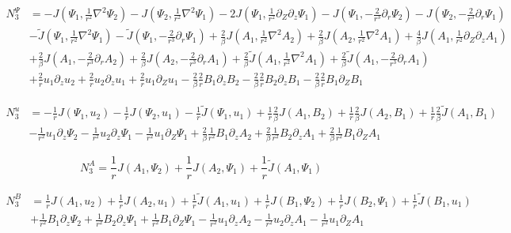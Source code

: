 \documentclass{emulateapj}
\newcommand{\beq}{\begin{equation}}
\newcommand{\eeq}{\end{equation}}
\begin{document}
\beq
\begin{split}
N_3^{\Psi} & = -J(\Psi_1, \frac{1}{r^2} \nabla^2 \Psi_2) - J(\Psi_2, \frac{1}{r^2} \nabla^2\Psi_1) - 2 J (\Psi_1, \frac{1}{r^2}\partial_Z\partial_z \Psi_1) - J(\Psi_1, -\frac{2}{r^3}\partial_r \Psi_2) - J(\Psi_2, -\frac{2}{r^3}\partial_r \Psi_1) \\
& - \widetilde{J}(\Psi_1, \frac{1}{r^2} \nabla^2 \Psi_1) - \widetilde{J} (\Psi_1, -\frac{2}{r^3}\partial_r \Psi_1) + \frac{2}{\beta} J(A_1, \frac{1}{r^2}\nabla^2 A_2) + \frac{2}{\beta} J(A_2, \frac{1}{r^2}\nabla^2 A_1) + \frac{4}{\beta} J(A_1, \frac{1}{r^2}\partial_Z\partial_z A_1) \\ 
& + \frac{2}{\beta} J(A_1, -\frac{2}{r^3} \partial_r A_2 ) + \frac{2}{\beta} J(A_2, -\frac{2}{r^3} \partial_r A_1) + \frac{2}{\beta} \widetilde{J} (A_1, \frac{1}{r^2} \nabla^2 A_1) + \frac{2}{\beta} \widetilde{J} (A_1, -\frac{2}{r^3} \partial_r A_1) \\
& + \frac{2}{r} u_1 \partial_z u_2 + \frac{2}{r} u_2 \partial_z u_1 + \frac{2}{r} u_1 \partial_Z u_1 - \frac{2}{\beta}\frac{2}{r} B_1\partial_z B_2 - \frac{2}{\beta}\frac{2}{r} B_2 \partial_z B_1 - \frac{2}{\beta} \frac{2}{r} B_1 \partial_Z B_1
\end{split}
\eeq

\beq
\begin{split}
N_3^u & = -\frac{1}{r}J\left(\Psi_1, u_2\right) - \frac{1}{r}J\left(\Psi_2, u_1\right) - \frac{1}{r}\widetilde{J} \left(\Psi_1, u_1\right) + \frac{1}{r}\frac{2}{\beta} J\left(A_1, B_2\right) + \frac{1}{r} \frac{2}{\beta} J\left(A_2, B_1\right) + \frac{1}{r}\frac{2}{\beta}\widetilde{J}\left(A_1, B_1\right) \\
& - \frac{1}{r^2} u_1\partial_z \Psi_2 - \frac{1}{r^2} u_2 \partial_z \Psi_1 - \frac{1}{r^2} u_1 \partial_Z \Psi_1 + \frac{2}{\beta} \frac{1}{r^2} B_1 \partial_z A_2 + \frac{2}{\beta} \frac{1}{r^2} B_2 \partial_z A_1 + \frac{2}{\beta} \frac{1}{r^2} B_1 \partial_Z A_1
\end{split}
\eeq

\beq
N_3^A = \frac{1}{r} J\left(A_1, \Psi_2\right) + \frac{1}{r}J\left(A_2, \Psi_1\right) + \frac{1}{r} \widetilde{J}\left(A_1, \Psi_1\right)
\eeq

\beq
\begin{split}
N_3^B & = \frac{1}{r} J\left(A_1, u_2\right) + \frac{1}{r} J\left(A_2, u_1\right) + \frac{1}{r}\widetilde{J}\left(A_1, u_1\right) + \frac{1}{r} J\left(B_1, \Psi_2\right) + \frac{1}{r} J\left(B_2, \Psi_1\right) + \frac{1}{r} \widetilde{J} \left(B_1, u_1\right) \\ 
& + \frac{1}{r^2} B_1\partial_z \Psi_2 + \frac{1}{r^2} B_2 \partial_z \Psi_1 + \frac{1}{r^2} B_1 \partial_Z \Psi_1 - \frac{1}{r^2} u_1 \partial_z A_2 - \frac{1}{r^2} u_2 \partial_z A_1 - \frac{1}{r^2} u_1 \partial_Z A_1
\end{split}
\eeq
\end{document}

